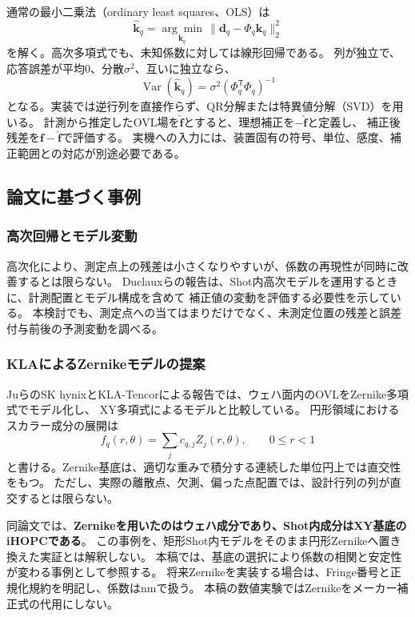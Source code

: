 \documentclass[11pt,a4paper]{ltjsarticle}
\begin{document}
通常の最小二乗法（ordinary least squares、OLS）は
\begin{equation}
 \widehat{\bm k}_q=\underset{\bm k_q}{\arg\min}\,
 \|\bm d_q-\Phi_q\bm k_q\|_2^2
 \label{eq:ols}
\end{equation}
を解く。高次多項式でも、未知係数に対しては線形回帰である。
列が独立で、応答誤差が平均0、分散$\sigma^2$、互いに独立なら、
\begin{equation}
 \operatorname{Var}(\widehat{\bm k}_q)
 =\sigma^2(\Phi_q^\mathsf T\Phi_q)^{-1}
 \label{eq:variance}
\end{equation}
となる。実装では逆行列を直接作らず、QR分解または特異値分解（SVD）を用いる。
計測から推定したOVL場を$\widehat{\bm f}$とすると、理想補正を$-\widehat{\bm f}$と定義し、
補正後残差を$\bm f-\widehat{\bm f}$で評価する。
実機への入力には、装置固有の符号、単位、感度、補正範囲との対応が別途必要である。

\subsection{論文に基づく事例}
\subsubsection{高次回帰とモデル変動}
高次化により、測定点上の残差は小さくなりやすいが、係数の再現性が同時に改善するとは限らない。
Duclauxらの報告は、Shot内高次モデルを運用するときに、計測配置とモデル構成を含めて
補正値の変動を評価する必要性を示している\cite{nicolas2020}。
本検討でも、測定点への当てはまりだけでなく、未測定位置の残差と誤差付与前後の予測変動を調べる。

\subsubsection{KLAによるZernikeモデルの提案}
JuらのSK hynixとKLA-Tencorによる報告では、ウェハ面内のOVLをZernike多項式でモデル化し、
XY多項式によるモデルと比較している\cite{ju2016}。
円形領域におけるスカラー成分の展開は
\begin{equation}
 f_q(r,\theta)=\sum_j c_{q,j}Z_j(r,\theta),\qquad 0\leq r<1
 \label{eq:zernike}
\end{equation}
と書ける。Zernike基底は、適切な重みで積分する連続した単位円上では直交性をもつ。
ただし、実際の離散点、欠測、偏った点配置では、設計行列の列が直交するとは限らない。

同論文では、\textbf{Zernikeを用いたのはウェハ成分であり、Shot内成分はXY基底のiHOPCである}。
この事例を、矩形Shot内モデルをそのまま円形Zernikeへ置き換えた実証とは解釈しない。
本稿では、基底の選択により係数の相関と安定性が変わる事例として参照する。
将来Zernikeを実装する場合は、Fringe番号と正規化規約を明記し、係数はnmで扱う。
本稿の数値実験ではZernikeをメーカー補正式の代用にしない。
\end{document}

